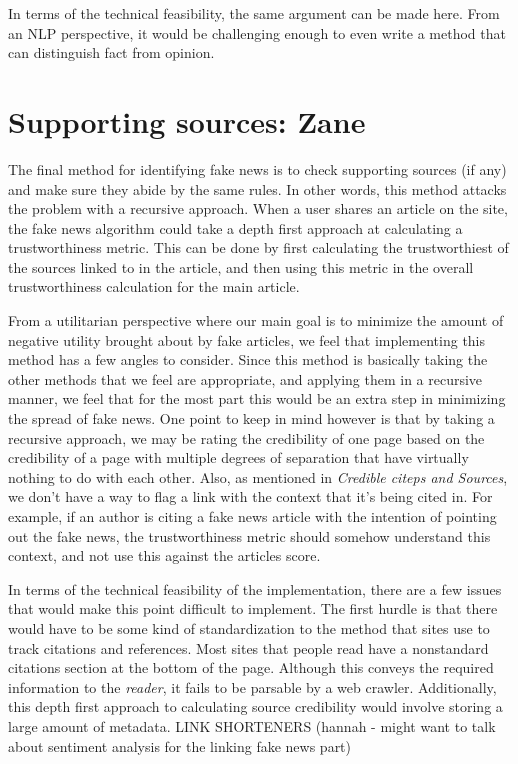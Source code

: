 \documentclass[12pt]{article}
\begin{document}
In terms of the technical feasibility, the same argument can be made here. From an NLP perspective, it would be challenging enough to even write a method that can distinguish fact from opinion.

\section{Supporting sources: Zane}
The final method for identifying fake news is to check supporting sources (if any) and make sure they abide by the same rules. In other words, this method attacks the problem with a recursive approach. When a user shares an article on the site, the fake news algorithm could take a depth first approach at calculating a trustworthiness metric. This can be done by first calculating the trustworthiest of the sources linked to in the article, and then using this metric in the overall trustworthiness calculation for the main article. 

From a utilitarian perspective where our main goal is to minimize the amount of negative utility brought about by fake articles, we feel that implementing this method has a few angles to consider. Since this method is basically taking the other methods that we feel are appropriate, and applying them in a recursive manner, we feel that for the most part this would be an extra step in minimizing the spread of fake news. One point to keep in mind however is that by taking a recursive approach, we may be rating the credibility of one page based on the credibility of a page with multiple degrees of separation that have virtually nothing to do with each other. Also, as mentioned in \textit{Credible citeps and Sources}, we don't have a way to flag a link with the context that it's being cited in. For example, if an author is citing a fake news article with the intention of pointing out the fake news, the trustworthiness metric should somehow understand this context, and not use this against the articles score.

In terms of the technical feasibility of the implementation, there are a few issues that would make this point difficult to implement. The first hurdle is that there would have to be some kind of standardization to the method that sites use to track citations and references. Most sites that people read have a nonstandard citations section at the bottom of the page. Although this conveys the required information to the \textit{reader}, it fails to be parsable by a web crawler. Additionally, this depth first approach to calculating source credibility would involve storing a large amount of metadata. LINK SHORTENERS (hannah - might want to talk about sentiment analysis for the linking fake news part)
\end{document}

